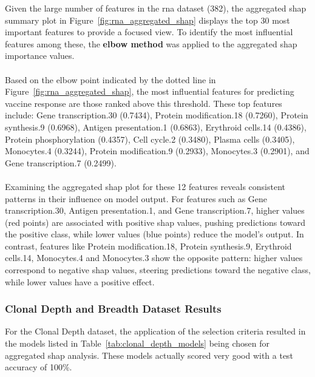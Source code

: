 \documentclass[12pt,a4paper]{report}
\begin{document}
\noindent
Given the large number of features in the \acrshort{rna} dataset (382), the aggregated \gls{shap} summary plot in Figure~\ref{fig:rna_aggregated_shap} displays the top 30 most important features to provide a focused view. To identify the most influential features among these, the \textbf{elbow method} was applied to the aggregated \gls{shap} importance values.\\
\\
Based on the elbow point indicated by the dotted line in Figure~\ref{fig:rna_aggregated_shap}, the most influential features for predicting vaccine response are those ranked above this threshold. These top features include: Gene transcription.30 (0.7434), Protein modification.18 (0.7260), Protein synthesis.9 (0.6968), Antigen presentation.1 (0.6863), Erythroid cells.14 (0.4386), Protein phosphorylation (0.4357), Cell cycle.2 (0.3480), Plasma cells (0.3405), Monocytes.4 (0.3244), Protein modification.9 (0.2933), Monocytes.3 (0.2901), and Gene transcription.7 (0.2499).\\
\\
Examining the aggregated \gls{shap} plot for these 12 features reveals consistent patterns in their influence on model output. For features such as Gene transcription.30, Antigen presentation.1, and Gene transcription.7, higher values (red points) are associated with positive \gls{shap} values, pushing predictions toward the positive class, while lower values (blue points) reduce the model's output. In contrast, features like Protein modification.18, Protein synthesis.9, Erythroid cells.14, Monocytes.4 and Monocytes.3 show the opposite pattern: higher values correspond to negative \gls{shap} values, steering predictions toward the negative class, while lower values have a positive effect.

\subsubsection*{Clonal Depth and Breadth Dataset Results}
For the Clonal Depth dataset, the application of the selection criteria resulted in the models listed in Table~\ref{tab:clonal_depth_models} being chosen for aggregated \gls{shap} analysis. These models actually scored very good with a test accuracy of 100\%.\\
\end{document}
